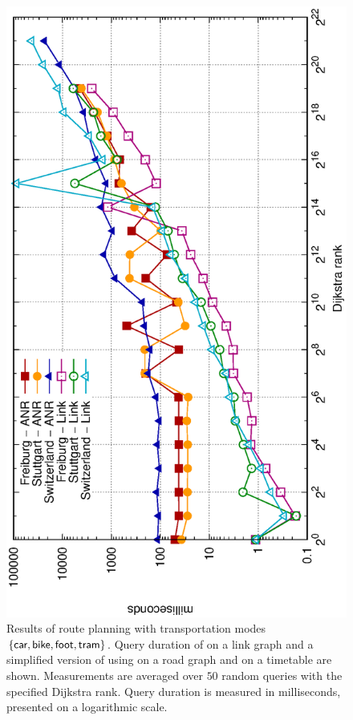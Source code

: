 	\begin{figure}[!ht]
		 \begin{center}
			\includegraphics[scale=0.55,angle=-90]{res/plots/multiModalResultsBaseline}
		\end{center}
		\caption{Results of \multiModal route planning with transportation modes $\{\textsf{car}, \textsf{bike}, \textsf{foot}, \textsf{tram}\}$.
			Query duration of \dijkstra on a link graph and a simplified version of \anr using \dijkstra on a road graph and \csa on a timetable
			are shown. Measurements are averaged over $50$ random queries with the specified Dijkstra rank. Query duration is measured
			in milliseconds, presented on a logarithmic scale.}
		\label{multiModalResultsBaseline}
	\end{figure}
